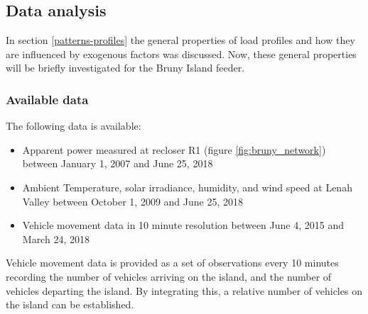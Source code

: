 \subsection{Data analysis}
\label{bruny-data-analysis}


In section \ref{patterns-profiles} the general properties of load profiles and how they are influenced by exogenous factors was discussed. Now, these general properties will be briefly investigated for the Bruny Island feeder.
\subsubsection{Available data}
The following data is available:
\begin{itemize}
	\item Apparent power measured at recloser R1 (figure \ref{fig:bruny_network}) between January 1, 2007 and June 25, 2018
	\item Ambient Temperature, solar irradiance, humidity, and wind speed at Lenah Valley between October 1, 2009 and June 25, 2018
	\item Vehicle movement data in 10 minute resolution between June 4, 2015 and March 24, 2018
\end{itemize}	
Vehicle movement data is provided as a set of observations every 10 minutes recording the number of vehicles arriving on the island, and the number of vehicles departing the island.
By integrating this, a relative number of vehicles on the island can be established.

